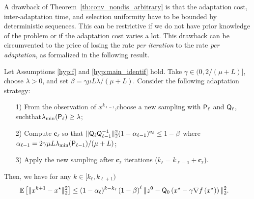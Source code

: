 {
A drawback of Theorem~\ref{th:conv_nondis_arbitrary} is that the adaptation cost, inter-adaptation time, and selection uniformity have to be bounded by deterministic sequences. This can be restrictive if we do not have prior knowledge of the problem or if the adaptation cost varies a lot. 
This drawback can be circumvented to the price of losing the rate \emph{per iteration} to the rate \emph{per adaptation}, as formalized in the following result.
        

\begin{theorem}\label{th:aggressive}
    Let Assumptions \ref{hyp:f} and  \ref{hyp:main_identif} hold. Take $\gamma\in(0,2/(\mu+L)]$, choose $\lambda>0$, and set $\beta = \gamma\mu L\lambda/(\mu+L)$. Consider the following adaptation strategy:
    \begin{itemize}
        \item[1)] From the observation of $x^{k_{\ell-1}}$\!,\;choose a new sampling with ${\mathsf{P}}_{\ell}$ and ${\mathsf{Q}}_\ell$,\,such\;that\;$\lambda_{ \min}({\mathsf{P}}_{\ell}) \geq \lambda$;
        \item[2)] Compute $\mathbf{c}_\ell$ so that $\|  {\mathsf{Q}}_\ell   {\mathsf{Q}}_{\ell-1}^{-1} \|_2^2 (1-\alpha_{\ell-1})^{\mathbf{c}_\ell} \leq 1 - \beta$ where $\alpha_{\ell-1} = 2\gamma \mu L \lambda_{ \min}({\mathsf{P}}_{\ell-1})/(\mu + L)$;
        \item[3)] Apply the new sampling %
        after $\mathbf{c}_\ell$ iterations ($k_{\ell} = k_{\ell-1}+\mathbf{c}_\ell$).
    \end{itemize}
    Then, we have for any $k\in [k_\ell,k_{\ell+1})$
    \begin{align*}
        \mathbb{E}\left[\|x^{k+1}-x^\star\|_2^2\right] &\leq (1-\alpha_\ell)^{k-k_\ell}  \left(1-\beta\right)^{\ell}  \|z^{0}-{\mathsf{Q}}_0\left(x^\star - \gamma\nabla f\left(x^\star\right)\right)\|_2^2. 
    \end{align*}
    \end{theorem}

}
